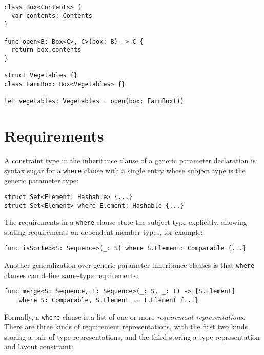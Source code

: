 \documentclass[a4paper,headsepline,bibliography=totoc,toc=flat,fleqn,twoside=semi]{scrbook}
\theoremstyle{definition}
\theoremstyle{definition}
\theoremstyle{definition}
\begin{document}
\begin{listing}\label{dependentconstrainttype}
\begin{Verbatim}
class Box<Contents> {
  var contents: Contents
}

func open<B: Box<C>, C>(box: B) -> C {
  return box.contents
}

struct Vegetables {}
class FarmBox: Box<Vegetables> {}

let vegetables: Vegetables = open(box: FarmBox())
\end{Verbatim}
\end{listing}

\section{Requirements}\label{trailing where clauses}
A constraint type in the inheritance clause of a generic parameter declaration is syntax sugar for a \texttt{where} clause with a single entry whose subject type is the generic parameter type:
\begin{Verbatim}
struct Set<Element: Hashable> {...}
struct Set<Element> where Element: Hashable {...}
\end{Verbatim}
The requirements in a \texttt{where} clause state the subject type explicitly, allowing stating requirements on dependent member types, for example:
\begin{Verbatim}
func isSorted<S: Sequence>(_: S) where S.Element: Comparable {...}
\end{Verbatim}
Another generalization over generic parameter inheritance clauses is that \texttt{where} clauses can define same-type requirements:
\begin{Verbatim}
func merge<S: Sequence, T: Sequence>(_: S, _: T) -> [S.Element]
    where S: Comparable, S.Element == T.Element {...}
\end{Verbatim}
Formally, a \texttt{where} clause is a list of one or more \emph{requirement representations}. There are three kinds of requirement representations, with the first two kinds storing a pair of type representations, and the third storing a type representation and layout constraint:
\end{document}
